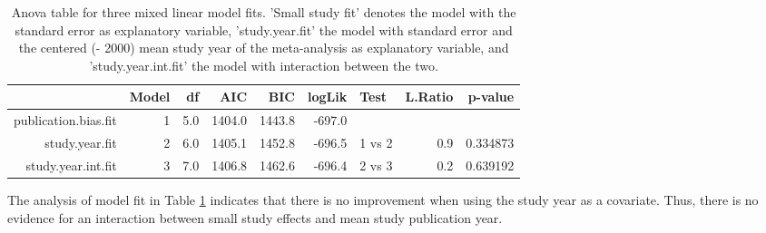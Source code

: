 \documentclass[11pt,a4paper,twoside]{book}\usepackage[]{graphicx}\usepackage[]{color}
\begin{document}
\begin{table}[ht]
\centering
\begingroup\scriptsize
\begin{tabular}{rrrrrrlrr}
  \hline
 & Model & df & AIC & BIC & logLik & Test & L.Ratio & p-value \\ 
  \hline
publication.bias.fit &  1 & 5.0 & 1404.0 & 1443.8 & -697.0 &  &  &  \\ 
  study.year.fit &  2 & 6.0 & 1405.1 & 1452.8 & -696.5 & 1 vs 2 & 0.9 & 0.334873 \\ 
  study.year.int.fit &  3 & 7.0 & 1406.8 & 1462.6 & -696.4 & 2 vs 3 & 0.2 & 0.639192 \\ 
   \hline
\end{tabular}
\endgroup
\caption{Anova table for three mixed linear model fits. 'Small study fit' denotes the model with the standard error as explanatory variable, 'study.year.fit' the model with standard error and the centered (- 2000) mean study year of the meta-analysis as explanatory variable, and 'study.year.int.fit' the model with interaction between the two.} 
\label{anova.lme.2}
\end{table}


The analysis of model fit in Table \ref{anova.lme.2} indicates that there is no improvement when using the study year as a covariate. Thus, there is no evidence for an interaction between small study effects and mean study publication year.
\end{document}
